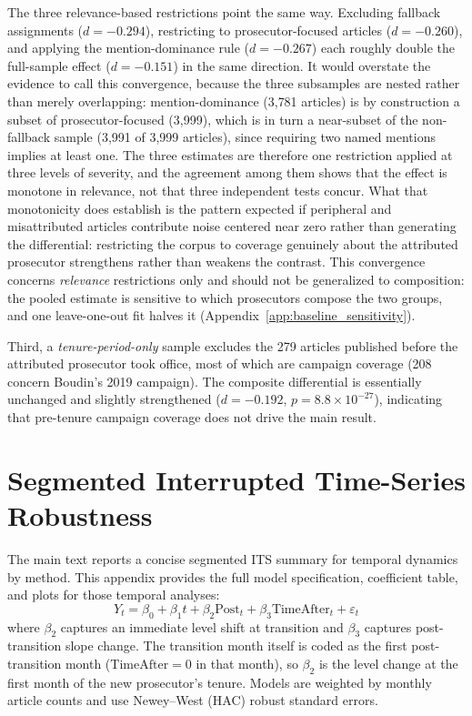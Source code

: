 \documentclass[12pt, letterpaper]{article}
\begin{document}
\begin{appendices}
The three relevance-based restrictions point the same way. Excluding fallback assignments ($d = -0.294$), restricting to prosecutor-focused articles ($d = -0.260$), and applying the mention-dominance rule ($d = -0.267$) each roughly double the full-sample effect ($d = -0.151$) in the same direction. It would overstate the evidence to call this convergence, because the three subsamples are nested rather than merely overlapping: mention-dominance (3{,}781 articles) is by construction a subset of prosecutor-focused (3{,}999), which is in turn a near-subset of the non-fallback sample (3{,}991 of 3{,}999 articles), since requiring two named mentions implies at least one. The three estimates are therefore one restriction applied at three levels of severity, and the agreement among them shows that the effect is monotone in relevance, not that three independent tests concur. What that monotonicity does establish is the pattern expected if peripheral and misattributed articles contribute noise centered near zero rather than generating the differential: restricting the corpus to coverage genuinely about the attributed prosecutor strengthens rather than weakens the contrast. This convergence concerns \emph{relevance} restrictions only and should not be generalized to composition: the pooled estimate is sensitive to which prosecutors compose the two groups, and one leave-one-out fit halves it (Appendix~\ref{app:baseline_sensitivity}).

Third, a \emph{tenure-period-only} sample excludes the 279 articles published before the attributed prosecutor took office, most of which are campaign coverage (208 concern Boudin's 2019 campaign). The composite differential is essentially unchanged and slightly strengthened ($d = -0.192$, $p = 8.8\times 10^{-27}$), indicating that pre-tenure campaign coverage does not drive the main result.

\section{Segmented Interrupted Time-Series Robustness}
\label{app:segmented_its}

The main text reports a concise segmented ITS summary for temporal dynamics by method. This appendix provides the full model specification, coefficient table, and plots for those temporal analyses:
\[
Y_t = \beta_0 + \beta_1 t + \beta_2 \text{Post}_t + \beta_3 \text{TimeAfter}_t + \varepsilon_t
\]
where $\beta_2$ captures an immediate level shift at transition and $\beta_3$ captures post-transition slope change. The transition month itself is coded as the first post-transition month ($\text{TimeAfter}=0$ in that month), so $\beta_2$ is the level change at the first month of the new prosecutor's tenure. Models are weighted by monthly article counts and use Newey--West (HAC) robust standard errors.


\end{appendices}
\end{document}
